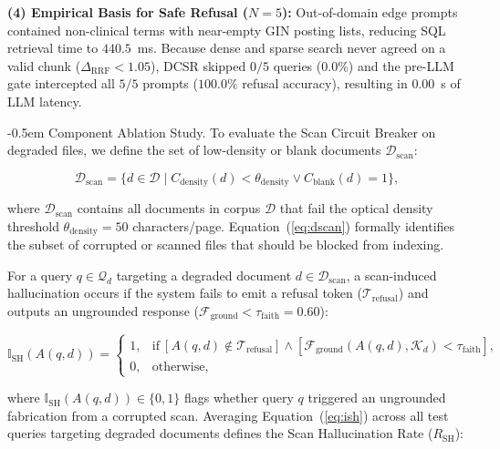 \documentclass[10pt]{SPIIRAS_Proceedings}
\makeatletter
\renewcommand\subsection{\@startsection{subsection}{2}{\parindent}%
  {\z@}%
  {-0.5em}%
  {\normalfont\normalsize\bfseries}}
\makeatother
\begin{document}
\textbf{(4) Empirical Basis for Safe Refusal ($N = 5$):} Out-of-domain edge prompts contained non-clinical terms with near-empty GIN posting lists, reducing SQL retrieval time to $440.5$~ms. Because dense and sparse search never agreed on a valid chunk ($\Delta_{\mathrm{RRF}} < 1.05$), DCSR skipped $0/5$ queries ($0.0\%$) and the pre-LLM gate intercepted all $5/5$ prompts ($100.0\%$ refusal accuracy), resulting in $0.00$~s of LLM latency.

\subsection{Component Ablation Study.} To evaluate the Scan Circuit Breaker on degraded files, we define the set of low-density or blank documents $\mathcal{D}_{\mathrm{scan}}$:

\begin{equation}
\mathcal{D}_{\mathrm{scan}} = \{ d \in \mathcal{D} \mid C_{\mathrm{density}}(d) < \theta_{\mathrm{density}} \lor C_{\mathrm{blank}}(d) = 1 \},
\label{eq:dscan}
\end{equation}

\noindent where $\mathcal{D}_{\mathrm{scan}}$ contains all documents in corpus $\mathcal{D}$ that fail the optical density threshold $\theta_{\mathrm{density}} = 50$ characters/page. Equation~(\ref{eq:dscan}) formally identifies the subset of corrupted or scanned files that should be blocked from indexing.

For a query $q \in \mathcal{Q}_d$ targeting a degraded document $d \in \mathcal{D}_{\mathrm{scan}}$, a scan-induced hallucination occurs if the system fails to emit a refusal token ($\mathcal{T}_{\mathrm{refusal}}$) and outputs an ungrounded response ($\mathcal{F}_{\mathrm{ground}} < \tau_{\mathrm{faith}} = 0.60$):

\begin{equation}
\mathbb{I}_{\mathrm{SH}}(A(q, d)) = 
\begin{cases} 
1, & \mathrm{if}\ [A(q, d) \notin \mathcal{T}_{\mathrm{refusal}}] \land [\mathcal{F}_{\mathrm{ground}}(A(q, d), \mathcal{K}_d) < \tau_{\mathrm{faith}}], \\
0, & \mathrm{otherwise},
\end{cases}
\label{eq:ish}
\end{equation}

\noindent where $\mathbb{I}_{\mathrm{SH}}(A(q, d)) \in \{0, 1\}$ flags whether query $q$ triggered an ungrounded fabrication from a corrupted scan. Averaging Equation~(\ref{eq:ish}) across all test queries targeting degraded documents defines the Scan Hallucination Rate ($R_{\mathrm{SH}}$):
\end{document}
